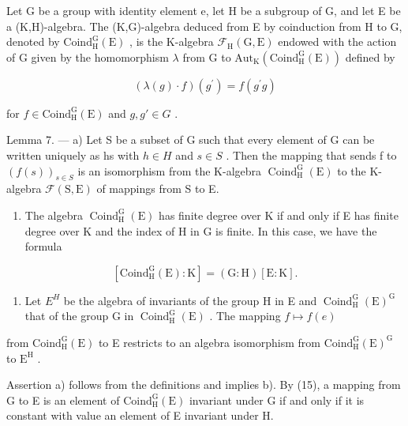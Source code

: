 Let G be a group with identity element e, let H be a subgroup of G, and let E be a (K,H)-algebra. The (K,G)-algebra deduced from E by coinduction from H to G, denoted by \(\mathrm{Coind}_{\mathrm{H}}^{\mathrm{G}}(\mathrm{E})\) , is the K-algebra \(\mathcal{F}_{\mathrm{H}}(\mathrm{G},\mathrm{E})\) endowed with the action of G given by the homomorphism \(\lambda\) from G to \(\mathrm{Aut}_{\mathrm{K}}(\mathrm{Coind}_{\mathrm{H}}^{\mathrm{G}}(\mathrm{E}))\) defined by

\[
(\lambda (g) \cdot f) (g ^ {\prime}) = f (g ^ {\prime} g)\tag{15}
\]

for \(f \in \text{Coind}_{\text{H}}^{\text{G}}(\text{E})\) and \(g, g' \in G\) .

Lemma 7. --- a) Let S be a subset of G such that every element of G can be written uniquely as hs with \(h \in H\) and \(s \in S\) . Then the mapping that sends f to \((f(s))_{s \in S}\) is an isomorphism from the K-algebra \(\operatorname{Coind}_{\mathrm{H}}^{\mathrm{G}}(\mathrm{E})\) to the K-algebra \(\mathcal{F}(\mathrm{S}, \mathrm{E})\) of mappings from S to E.

\begin{enumerate}
\def\labelenumi{\alph{enumi})}
\setcounter{enumi}{1}
\tightlist
\item
  The algebra \(\operatorname{Coind}_{\mathrm{H}}^{\mathrm{G}}(\mathrm{E})\) has finite degree over K if and only if E has finite degree over K and the index of H in G is finite. In this case, we have the formula
\end{enumerate}

\[
[ \mathrm{Coind} _ {\mathrm{H}} ^ {\mathrm{G}} (\mathrm{E}): \mathrm{K} ] = (\mathrm{G}: \mathrm{H}) [ \mathrm{E}: \mathrm{K} ].
\]

\begin{enumerate}
\def\labelenumi{\alph{enumi})}
\setcounter{enumi}{2}
\tightlist
\item
  Let \(E^{H}\) be the algebra of invariants of the group H in E and \(\operatorname{Coind}_{\mathrm{H}}^{\mathrm{G}}(\mathrm{E})^{\mathrm{G}}\) that of the group G in \(\operatorname{Coind}_{\mathrm{H}}^{\mathrm{G}}(\mathrm{E})\) . The mapping \(f \mapsto f(e)\)
\end{enumerate}

from \(\mathrm{Coind}_{\mathrm{H}}^{\mathrm{G}}(\mathrm{E})\) to E restricts to an algebra isomorphism from \(\mathrm{Coind}_{\mathrm{H}}^{\mathrm{G}}(\mathrm{E})^{\mathrm{G}}\) to \(\mathrm{E}^{\mathrm{H}}\) .

Assertion a) follows from the definitions and implies b). By (15), a mapping from G to E is an element of \(\mathrm{Coind}_{\mathrm{H}}^{\mathrm{G}}(\mathrm{E})\) invariant under G if and only if it is constant with value an element of E invariant under H.

